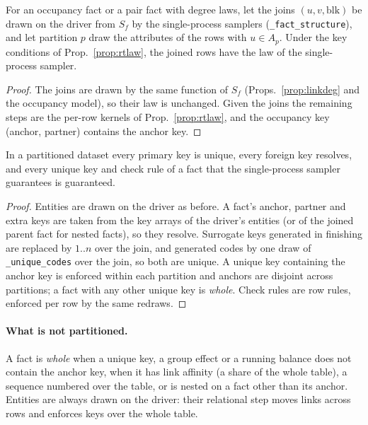 \begin{proposition}\label{prop:rtstructure}
For an occupancy fact or a pair fact with degree laws, let the joins $(u,v,\mathrm{blk})$ be drawn on the driver from $S_f$ by the single-process samplers (\texttt{\_fact\_structure}), and let partition $p$ draw the attributes of the rows with $u\in A_p$. Under the key conditions of Prop.~\ref{prop:rtlaw}, the joined rows have the law of the single-process sampler.
\end{proposition}
\begin{proof}
The joins are drawn by the same function of $S_f$ (Props.~\ref{prop:linkdeg} and the occupancy model), so their law is unchanged. Given the joins the remaining steps are the per-row kernels of Prop.~\ref{prop:rtlaw}, and the occupancy key (anchor, partner) contains the anchor key.
\end{proof}

\begin{proposition}\label{prop:rtkeys}
In a partitioned dataset every primary key is unique, every foreign key resolves, and every unique key and check rule of a fact that the single-process sampler guarantees is guaranteed.
\end{proposition}
\begin{proof}
Entities are drawn on the driver as before. A fact's anchor, partner and extra keys are taken from the key arrays of the driver's entities (or of the joined parent fact for nested facts), so they resolve. Surrogate keys generated in finishing are replaced by $1..n$ over the join, and generated codes by one draw of \texttt{\_unique\_codes} over the join, so both are unique. A unique key containing the anchor key is enforced within each partition and anchors are disjoint across partitions; a fact with any other unique key is \emph{whole}. Check rules are row rules, enforced per row by the same redraws.
\end{proof}

\paragraph{What is not partitioned.} A fact is \emph{whole} when a unique key, a group effect or a running balance does not contain the anchor key, when it has link affinity (a share of the whole table), a sequence numbered over the table, or is nested on a fact other than its anchor. Entities are always drawn on the driver: their relational step moves links across rows and enforces keys over the whole table.

